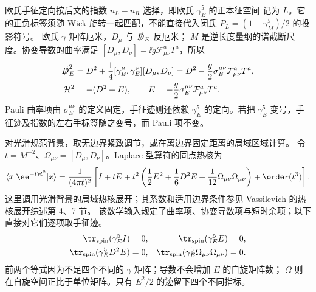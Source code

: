 \begin{derivation}[轴向变换中的费米子测度与反常]
\begin{align*}
\end{align*}
欧氏手征定向按后文的指数 $n_L-n_R$ 选择，即欧氏 $\gamma_E^5$ 的正本征空间
记为 $L$。它的正负标签须随 Wick 旋转一起匹配，不能直接代入闵氏
$P_L=(1-\gamma_M^5)/2$ 的投影符号。
欧氏 $\gamma$ 矩阵厄米，$D_\mu$ 与 $\slashed D_E$ 反厄米；
$M$ 是逆长度量纲的谱截断尺度。协变导数的曲率满足
$[D_\mu,D_\nu]=\ii g\mathcal F_{\mu\nu}^aT^a$，所以
\begin{align*}
\slashed D_E^2
&=D^2+\frac14[\gamma_E^\mu,\gamma_E^\nu][D_\mu,D_\nu]
=D^2-\frac g2\sigma_E^{\mu\nu}\mathcal F_{\mu\nu}^aT^a,\\
\mathcal H^2&=-(D^2+E),\qquad
E=-\frac g2\sigma_E^{\mu\nu}\mathcal F_{\mu\nu}^aT^a.
\end{align*}
Pauli 曲率项由 $\sigma_E^{\mu\nu}$ 的定义固定，手征迹则还依赖 $\gamma_E^5$ 的定向。若把 $\gamma_E^5$ 变号，手征迹及指数的左右手标签随之变号，而 Pauli 项不变。

对光滑规范背景，取无边界紧致调节，或在离边界固定距离的局域区域计算。
令 $t=M^{-2}$、$\Omega_{\mu\nu}=[D_\mu,D_\nu]$。Laplace 型算符的同点热核为
\begin{equation*}
\langle x|\ee^{-t\mathcal H^2}|x\rangle
=\frac1{(4\pi t)^2}\left[
I+tE+t^2\left(\frac12E^2+\frac16D^2E
+\frac1{12}\Omega_{\mu\nu}\Omega_{\mu\nu}\right)+\order(t^3)\right].
\end{equation*}
这里调用光滑背景的局域热核展开；其系数和适用边界条件参见
\href{https://arxiv.org/abs/hep-th/0306138}{Vassilevich 的热核展开综述}第 4、7 节。
该数学输入规定了曲率项、协变导数项与短时余项；以下直接对它们逐项取手征迹。
\begin{align*}
\tr_{\rm spin}(\gamma_E^5 I)&=0,&
\tr_{\rm spin}(\gamma_E^5 E)&=0,\\
\tr_{\rm spin}(\gamma_E^5D^2E)&=0,&
\tr_{\rm spin}(\gamma_E^5\Omega_{\mu\nu}\Omega_{\mu\nu})&=0.
\end{align*}
前两个等式因为不足四个不同的 $\gamma$ 矩阵；导数不会增加 $E$ 的自旋矩阵数；
$\Omega$ 则在自旋空间正比于单位矩阵。只有 $E^2/2$ 的迹留下四个不同指标。


\end{derivation}
